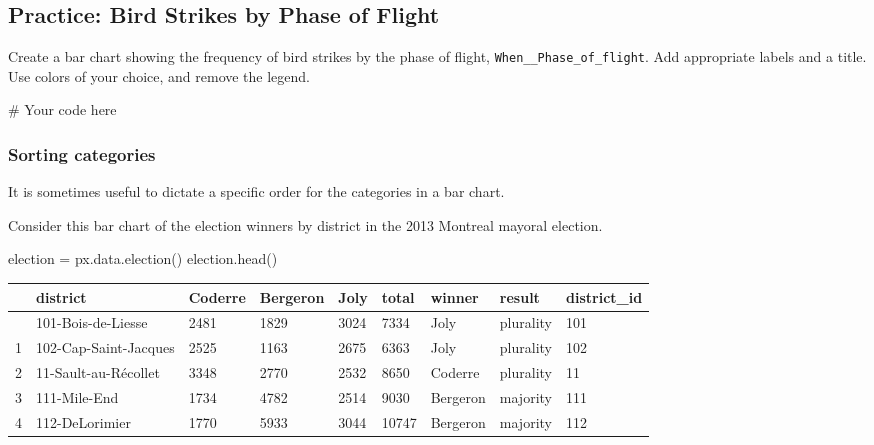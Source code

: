 \documentclass[
  letterpaper,
  DIV=11,
  numbers=noendperiod]{scrreprt}
\newenvironment{Shaded}{\begin{snugshade}}{\end{snugshade}}
\newcommand{\CommentTok}[1]{\textcolor[rgb]{0.37,0.37,0.37}{#1}}
\newcommand{\NormalTok}[1]{\textcolor[rgb]{0.00,0.23,0.31}{#1}}
\newcommand{\OperatorTok}[1]{\textcolor[rgb]{0.37,0.37,0.37}{#1}}
\begin{document}
\begin{tcolorbox}[enhanced jigsaw, colframe=quarto-callout-tip-color-frame, opacityback=0, titlerule=0mm, bottomrule=.15mm, breakable, leftrule=.75mm, colbacktitle=quarto-callout-tip-color!10!white, title=\textcolor{quarto-callout-tip-color}{\faLightbulb}\hspace{0.5em}{Practice}, rightrule=.15mm, coltitle=black, opacitybacktitle=0.6, colback=white, left=2mm, arc=.35mm, toptitle=1mm, bottomtitle=1mm, toprule=.15mm]

\subsection{Practice: Bird Strikes by Phase of
Flight}\label{practice-bird-strikes-by-phase-of-flight}

Create a bar chart showing the frequency of bird strikes by the phase of
flight, \texttt{When\_\_Phase\_of\_flight}. Add appropriate labels and a
title. Use colors of your choice, and remove the legend.

\begin{Shaded}
\begin{Highlighting}[]
\CommentTok{\# Your code here}
\end{Highlighting}
\end{Shaded}

\end{tcolorbox}

\subsubsection{Sorting categories}\label{sorting-categories}

It is sometimes useful to dictate a specific order for the categories in
a bar chart.

Consider this bar chart of the election winners by district in the 2013
Montreal mayoral election.

\begin{Shaded}
\begin{Highlighting}[]
\NormalTok{election }\OperatorTok{=}\NormalTok{ px.data.election()}
\NormalTok{election.head()}
\end{Highlighting}
\end{Shaded}

\begin{longtable}[]{@{}lllllllll@{}}
\toprule\noalign{}
& district & Coderre & Bergeron & Joly & total & winner & result &
district\_id \\
\midrule\noalign{}
\endhead
\bottomrule\noalign{}
\endlastfoot
0 & 101-Bois-de-Liesse & 2481 & 1829 & 3024 & 7334 & Joly & plurality &
101 \\
1 & 102-Cap-Saint-Jacques & 2525 & 1163 & 2675 & 6363 & Joly & plurality
& 102 \\
2 & 11-Sault-au-Récollet & 3348 & 2770 & 2532 & 8650 & Coderre &
plurality & 11 \\
3 & 111-Mile-End & 1734 & 4782 & 2514 & 9030 & Bergeron & majority &
111 \\
4 & 112-DeLorimier & 1770 & 5933 & 3044 & 10747 & Bergeron & majority &
112 \\
\end{longtable}
\end{document}
